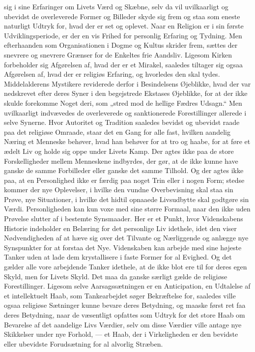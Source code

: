 \documentclass[12pt,a4paper]{article}
\newcommand{\opage}[1]{\marginnote{\footnotesize\textit{[#1]}}}
\begin{document}
sig i sine Erfaringer om Livets Værd og Skæbne, selv da vil uvilkaarligt og
ubevidst de overleverede Former og Billeder skyde sig frem og staa som eneste
naturligt Udtryk for, hvad der er set og oplevet. Naar en Religion er i sin
første Udviklingsperiode, er der en vis Frihed for personlig Erfaring og
Tydning. Men efterhaanden som Organisationen i Dogme og Kultus skrider frem,
sættes der snevrere og snevrere Grænser for de Enkeltes frie Aandsliv. Ligesom
Kirken forbeholder sig Afgørelsen af, hvad der er et Mirakel, saaledes tiltager
sig ogsaa Afgørelsen af, hvad der er religiøs Erfaring, og \opage{46} hvorledes den skal
tydes. Middelalderens Mystikere reviderede derfor i Besindelsens Øjeblikke, hvad
der var nedskrevet efter deres Syner i den begejstrede Ekstases Øjeblikke, for
at der ikke skulde forekomme Noget deri, som „stred mod de hellige Fædres
Udsagn.“ Men uvilkaarligt indvævedes de overleverede og sanktionerede
Forestillinger allerede i selve Synerne. Hvor Autoritet og Tradition saaledes
bevidst og ubevidst raade paa det religiøse Omraade, staar det en Gang for alle
fast, hvilken aandelig Næring et Menneske behøver, hvad han behøver for at tro
og haabe, for at føre et ædelt Liv og holde sig oppe under Livets Kamp. Der
agtes ikke paa de store Forskelligheder mellem Menneskene indbyrdes, der gør, at
de ikke kunne have ganske de samme Forbilleder eller ganske det samme Tilhold.
Og der agtes ikke paa, at en Personlighed ikke er færdig paa noget Trin eller i
nogen Form; stedse kommer der nye Oplevelser, i hvilke den vundne Overbevisning
skal staa sin Prøve, nye Situationer, i hvilke det hidtil opnaaede Livsudbytte
skal godtgøre sin Værdi. Personligheden kan kun voxe med sine større Formaal,
naar den ikke uden Prøvelse slutter af i bestemte Synsmaader. Her er et Punkt,
hvor Videnskabens Historie indeholder en Belæring for det personlige Liv
idethele, idet den viser Nødvendigheden af at hæve sig over det Tilvante og
Nærliggende og anlægge nye Synspunkter for at forstaa det Nye. Videnskaben kan
arbejde med sine højeste Tanker uden at lade dem krystallisere i faste Former
for al Evighed. Og det gælder alle vore arbejdende Tanker idethele, at de ikke
blot ere til for deres egen Skyld, men for Livets Skyld. Det maa da ganske
særligt gælde de religiøse Forestillinger. Ligesom selve Aarsagssætningen er en
Anticipation, en Udtalelse af et intellektuelt Haab, som Tankearbejdet søger
Bekræftelse for, saaledes ville ogsaa religiøse Sætninger kunne bevare deres
Betydning, og maaske først ret faa deres Betydning, naar de væsentligt \opage{47} opfattes
som Udtryk for det store Haab om Bevarelse af det aandelige Livs Værdier, selv
om disse Værdier ville antage nye Skikkelser under nye Forhold, --- et Haab, der
i Virkeligheden er den bevidste eller ubevidste Forudsætning for al alvorlig
Stræben.
\end{document}

